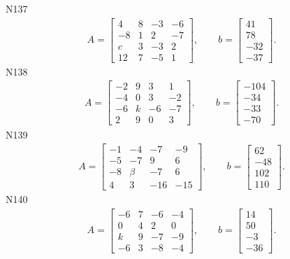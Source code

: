 \documentclass[11pt]{report}
\begin{document}
N137
\begin{align*}
 A = \left[\begin{matrix}4 & 8 & -3 & -6\\-8 & 1 & 2 & -7\\c & 3 & -3 & 2\\12 & 7 & -5 & 1\end{matrix}\right],
\qquad b = \left[\begin{matrix}41\\78\\-32\\-37\end{matrix}\right]. 
 \end{align*}
N138
\begin{align*}
 A = \left[\begin{matrix}-2 & 9 & 3 & 1\\-4 & 0 & 3 & -2\\-6 & k & -6 & -7\\2 & 9 & 0 & 3\end{matrix}\right],
\qquad b = \left[\begin{matrix}-104\\-34\\-33\\-70\end{matrix}\right]. 
 \end{align*}
N139
\begin{align*}
 A = \left[\begin{matrix}-1 & -4 & -7 & -9\\-5 & -7 & 9 & 6\\-8 & \beta & -7 & 6\\4 & 3 & -16 & -15\end{matrix}\right],
\qquad b = \left[\begin{matrix}62\\-48\\102\\110\end{matrix}\right]. 
 \end{align*}
N140
\begin{align*}
 A = \left[\begin{matrix}-6 & 7 & -6 & -4\\0 & 4 & 2 & 0\\k & 9 & -7 & -9\\-6 & 3 & -8 & -4\end{matrix}\right],
\qquad b = \left[\begin{matrix}14\\50\\-3\\-36\end{matrix}\right]. 
 \end{align*}
\end{document}

